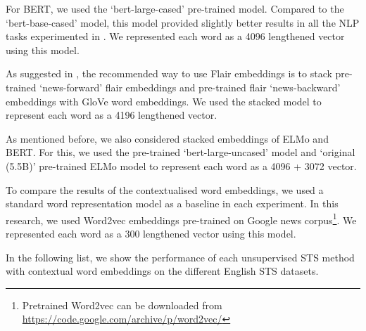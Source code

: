For BERT, we used the `bert-large-cased' pre-trained model. Compared to the `bert-base-cased' model, this model provided slightly better results in all the NLP tasks experimented in \textcite{devlin-etal-2019-bert}. We represented each word as a 4096 lengthened vector using this model. 

As suggested in \textcite{akbik-etal-2018-contextual}, the recommended way to use Flair embeddings is to stack pre-trained `news-forward' flair embeddings and pre-trained flair `news-backward' embeddings with GloVe \autocite{pennington-etal-2014-glove} word embeddings. We used the stacked model to represent each word as a 4196 lengthened vector. 

As mentioned before, we also considered stacked embeddings of ELMo and BERT. For this, we used the pre-trained `bert-large-uncased' model and `original (5.5B)' pre-trained ELMo model to represent each word as a 4096 + 3072 vector.

To compare the results of the contextualised word embeddings, we used a standard word representation model as a baseline in each experiment. In this research, we used Word2vec embeddings \autocite{DBLP:journals/corr/abs-1301-3781} pre-trained on Google news corpus\footnote{Pretrained Word2vec can be downloaded from \url{https://code.google.com/archive/p/word2vec/}}. We represented each word as a 300 lengthened vector using this model.

In the following list, we show the performance of each unsupervised STS method with contextual word embeddings on the different English STS datasets. 

